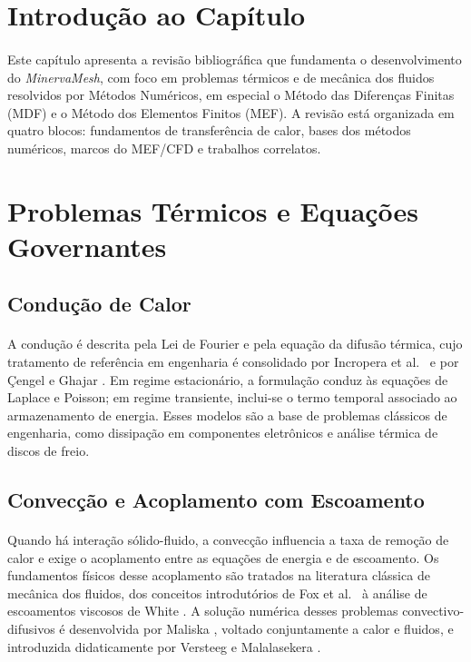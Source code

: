 \section{Introdução ao Capítulo}
\label{sec:revbiblio_intro}

\paragraph{}Este capítulo apresenta a revisão bibliográfica que fundamenta o desenvolvimento do \textit{MinervaMesh}, com foco em problemas térmicos e de mecânica dos fluidos resolvidos por Métodos Numéricos, em especial o Método das Diferenças Finitas (MDF) e o Método dos Elementos Finitos (MEF). A revisão está organizada em quatro blocos: fundamentos de transferência de calor, bases dos métodos numéricos, marcos do MEF/CFD e trabalhos correlatos.

\section{Problemas Térmicos e Equações Governantes}

\subsection{Condução de Calor}
\paragraph{}A condução é descrita pela Lei de Fourier e pela equação da difusão térmica, cujo tratamento de referência em engenharia é consolidado por Incropera et al.\ \cite{Incropera2006} e por Çengel e Ghajar \cite{Cengel2015}. Em regime estacionário, a formulação conduz às equações de Laplace e Poisson; em regime transiente, inclui-se o termo temporal associado ao armazenamento de energia. Esses modelos são a base de problemas clássicos de engenharia, como dissipação em componentes eletrônicos e análise térmica de discos de freio.

\subsection{Convecção e Acoplamento com Escoamento}
\paragraph{}Quando há interação sólido-fluido, a convecção influencia a taxa de remoção de calor e exige o acoplamento entre as equações de energia e de escoamento. Os fundamentos físicos desse acoplamento são tratados na literatura clássica de mecânica dos fluidos, dos conceitos introdutórios de Fox et al.\ \cite{Fox2012} à análise de escoamentos viscosos de White \cite{White2006}. A solução numérica desses problemas convectivo-difusivos é desenvolvida por Maliska \cite{Maliska2004}, voltado conjuntamente a calor e fluidos, e introduzida didaticamente por Versteeg e Malalasekera \cite{Versteeg2007}.

